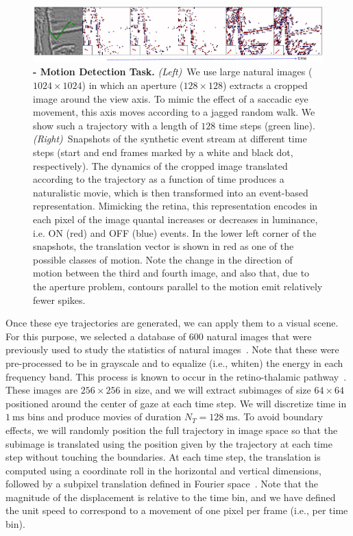 \documentclass[default]{sn-jnl}%
\theoremstyle{thmstyleone}%
\theoremstyle{thmstyletwo}%
\theoremstyle{thmstylethree}%
\newcommand{\ms}{\si{\milli\second}}%
\begin{document}
\begin{figure}%
    \centering
    \includegraphics[width=0.95\linewidth]{figures/motion_task.pdf}
    \caption{
        {\bf - Motion Detection Task.} \textit{(Left)}~We use large natural images ($1024\times1024$) in which an aperture ($128\times128$) extracts a cropped image around the view axis. To mimic the effect of a saccadic eye movement, this axis moves according to a jagged random walk. We show such a trajectory with a length of $128$ time steps (green line). \textit{(Right)}~Snapshots of the synthetic event stream at different time steps (start and end frames marked by a white and black dot, respectively). The dynamics of the cropped image translated according to the trajectory as a function of time produces a naturalistic movie, which is then transformed into an event-based representation. Mimicking the retina, this representation encodes in each pixel of the image quantal increases or decreases in luminance, i.e. ON (red) and OFF (blue) events. In the lower left corner of the snapshots, the translation vector is shown in red as one of the possible classes of motion. Note the change in the direction of motion between the third and fourth image, and also that, due to the aperture problem, contours parallel to the motion emit relatively fewer spikes.
        }
    \label{fig:motion_task}
\end{figure}
Once these eye trajectories are generated, we can apply them to a visual scene. For this purpose, we selected a database of $600$ natural images that were previously used to study the statistics of natural images~\citep{perrinet_edge_2015}. Note that these were pre-processed to be in grayscale and to equalize (i.e., whiten) the energy in each frequency band. This process is known to occur in the retino-thalamic pathway~\citep{dan_efficient_1996}. These images are $256 \times 256$ in size, and we will extract subimages of size $64 \times 64$ positioned around the center of gaze at each time step. We will discretize time in $1~\ms$ bins and produce movies of duration $N_T = 128~\ms$. To avoid boundary effects, we will randomly position the full trajectory in image space so that the subimage is translated using the position given by the trajectory at each time step without touching the boundaries. At each time step, the translation is computed using a coordinate roll in the horizontal and vertical dimensions, followed by a subpixel translation defined in Fourier space~\citep{perrinet_sparse_2015}. Note that the magnitude of the displacement is relative to the time bin, and we have defined the unit speed to correspond to a movement of one pixel per frame (i.e., per time bin).
\end{document}
